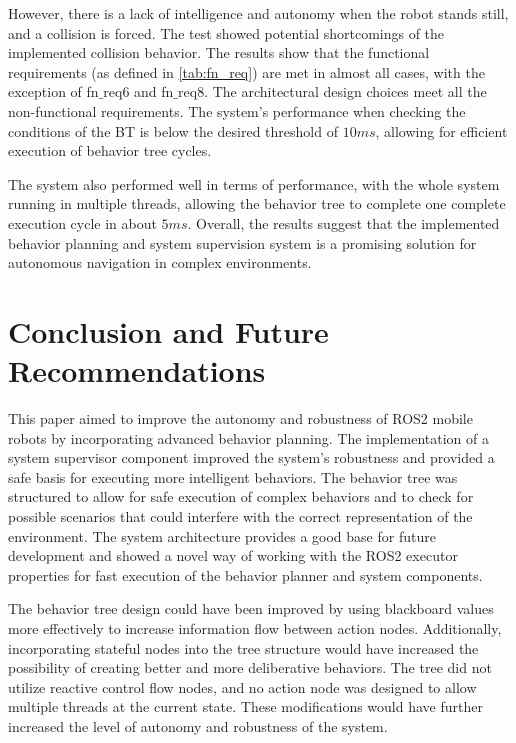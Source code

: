 \documentclass[letterpaper, 10pt, conference]{ieeeconf}
\begin{document}
However, there is a lack of intelligence and autonomy when the robot stands still, and a collision is forced. The test showed potential shortcomings of the implemented collision behavior. The results show that the functional requirements (as defined in \ref{tab:fn_req}) are met in almost all cases, with the exception of fn$\_$req6 and fn$\_$req8. The architectural design choices meet all the non-functional requirements. The system's performance when checking the conditions of the BT is below the desired threshold of $10ms$, allowing for efficient execution of behavior tree cycles. 

The system also performed well in terms of performance, with the whole system running in multiple threads, allowing the behavior tree to complete one complete execution cycle in about $5ms$. Overall, the results suggest that the implemented behavior planning and system supervision system is a promising solution for autonomous navigation in complex environments.


\section{Conclusion and Future Recommendations}
\label{sec:Conclusion}

This paper aimed to improve the autonomy and robustness of ROS2 mobile robots by incorporating advanced behavior planning. The implementation of a system supervisor component improved the system's robustness and provided a safe basis for executing more intelligent behaviors. The behavior tree was structured to allow for safe execution of complex behaviors and to check for possible scenarios that could interfere with the correct representation of the environment. The system architecture provides a good base for future development and showed a novel way of working with the ROS2 executor properties for fast execution of the behavior planner and system components.

The behavior tree design could have been improved by using blackboard values more effectively to increase information flow between action nodes. Additionally, incorporating stateful nodes into the tree structure would have increased the possibility of creating better and more deliberative behaviors. The tree did not utilize reactive control flow nodes, and no action node was designed to allow multiple threads at the current state. These modifications would have further increased the level of autonomy and robustness of the system.
\end{document}
